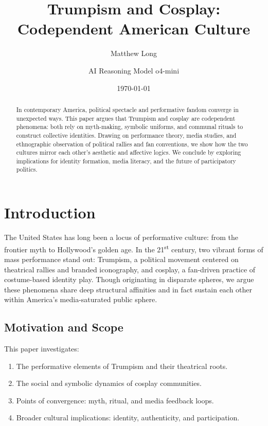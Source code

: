 \documentclass[11pt]{article}
\title{Trumpism and Cosplay:\\
Codependent American Culture}
\author[1]{Matthew Long}
\author[2]{AI Reasoning Model o4-mini}
\affil[1]{Magneton Labs, Chicago, IL, USA}
\affil[2]{OpenAI}
\date{\today}
\begin{document}
\maketitle

\begin{abstract}
In contemporary America, political spectacle and performative fandom converge in unexpected ways. This paper argues that Trumpism and cosplay are codependent phenomena: both rely on myth-making, symbolic uniforms, and communal rituals to construct collective identities. Drawing on performance theory, media studies, and ethnographic observation of political rallies and fan conventions, we show how the two cultures mirror each other’s aesthetic and affective logics. We conclude by exploring implications for identity formation, media literacy, and the future of participatory politics.
\end{abstract}

\tableofcontents
\clearpage

\section{Introduction}
The United States has long been a locus of performative culture: from the frontier myth to Hollywood’s golden age. In the 21\textsuperscript{st} century, two vibrant forms of mass performance stand out: Trumpism, a political movement centered on theatrical rallies and branded iconography, and cosplay, a fan-driven practice of costume-based identity play. Though originating in disparate spheres, we argue these phenomena share deep structural affinities and in fact sustain each other within America’s media-saturated public sphere.

\subsection{Motivation and Scope}
This paper investigates:
\begin{enumerate}[label=(\alph*)]
  \item The performative elements of Trumpism and their theatrical roots.
  \item The social and symbolic dynamics of cosplay communities.
  \item Points of convergence: myth, ritual, and media feedback loops.
  \item Broader cultural implications: identity, authenticity, and participation.
\end{enumerate}
\end{document}
